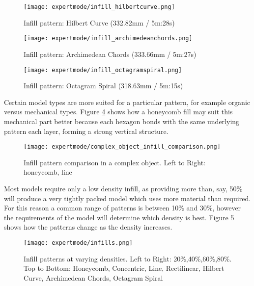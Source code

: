 \begin{figure}[H]
\centering
\texttt{[image: expertmode/infill\_hilbertcurve.png]}
\caption{Infill pattern: Hilbert Curve (332.82mm / 5m:28s)}
\label{fig:infill_hilbertcurve}
\end{figure}

\begin{figure}[H]
\centering
\texttt{[image: expertmode/infill\_archimedeanchords.png]}
\caption{Infill pattern: Archimedean Chords (333.66mm / 5m:27s)}
\label{fig:infill_archimedeanchords}
\end{figure}

\begin{figure}[H]
\centering
\texttt{[image: expertmode/infill\_octagramspiral.png]}
\caption{Infill pattern: Octagram Spiral (318.63mm / 5m:15s)}
\label{fig:infill_octagramspiral}
\end{figure}


Certain model types are more suited for a particular pattern, for example organic versus mechanical types.  Figure \ref{fig:complex_object_infill_comparison} shows how a honeycomb fill may suit this mechanical part better because each hexagon bonds with the same underlying pattern each layer, forming a strong vertical structure.

\begin{figure}[H]
\centering
\texttt{[image: expertmode/complex\_object\_infill\_comparison.png]}
\caption{Infill pattern comparison in a complex object. Left to Right: honeycomb, line}
\label{fig:complex_object_infill_comparison}
\end{figure}

Most models require only a low density infill, as providing more than, say, 50\% will produce a very tightly packed model which uses more material than required.  For this reason a common range of patterns is between 10\% and 30\%, however the requirements of the model will determine which density is best.  Figure \ref{fig:infill_pattern_densities} shows how the patterns change as the density increases.
\begin{figure}[H]
\centering
\texttt{[image: expertmode/infills.png]}
\caption{Infill patterns at varying densities. Left to Right: 20\%,40\%,60\%,80\%. Top to Bottom: Honeycomb, Concentric, Line, Rectilinear, Hilbert Curve, Archimedean Chords, Octagram Spiral}
\label{fig:infill_pattern_densities}
\end{figure}

